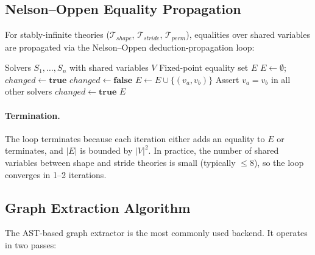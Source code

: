 \documentclass[10pt]{article}
\newcommand{\Tshape}{\mathcal{T}_{\mathit{shape}}}
\newcommand{\Tstride}{\mathcal{T}_{\mathit{stride}}}
\newcommand{\Tperm}{\mathcal{T}_{\mathit{perm}}}
\theoremstyle{plain}
\theoremstyle{definition}
\theoremstyle{remark}
\begin{document}
\subsection{Nelson--Oppen Equality Propagation}

For stably-infinite theories ($\Tshape$, $\Tstride$, $\Tperm$),
equalities over shared variables are propagated via the
Nelson--Oppen deduction-propagation loop:

\begin{algorithm}[t]
\caption{Nelson--Oppen equality propagation}
\label{alg:no}
\begin{algorithmic}[1]
\Require Solvers $S_1, \ldots, S_n$ with shared variables $V$
\Ensure Fixed-point equality set $E$
\State $E \gets \emptyset$; $\mathit{changed} \gets \textbf{true}$
  \State $\mathit{changed} \gets \textbf{false}$
        \State $E \gets E \cup \{(v_a, v_b)\}$
        \State Assert $v_a = v_b$ in all other solvers
        \State $\mathit{changed} \gets \textbf{true}$
      \EndIf
    \EndFor
  \EndFor
\EndWhile
\Return $E$
\end{algorithmic}
\end{algorithm}

\paragraph{Termination.}
The loop terminates because each iteration either adds an equality
to $E$ or terminates, and $|E|$ is bounded by $|V|^2$.  In practice,
the number of shared variables between shape and stride theories is
small (typically $\leq 8$), so the loop converges in 1--2 iterations.

\subsection{Graph Extraction Algorithm}

The AST-based graph extractor is the most commonly used backend.
It operates in two passes:
\end{document}
